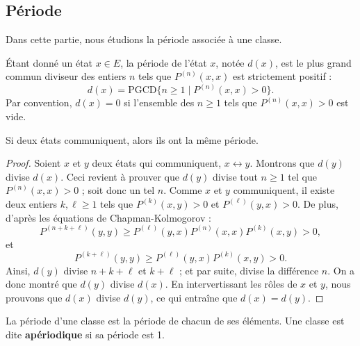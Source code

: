\subsection{Période}
Dans cette partie, nous étudions la période associée à une classe.

\begin{definition}[7.4]
Étant donné un état $x \in E$, la période de l’état $x$, notée $d(x)$, est le plus grand commun diviseur des entiers $n$ tels que $P^{(n)}(x, x)$ est strictement positif :
\[
d(x) = \mathrm{PGCD}\{n \geq 1 \mid P^{(n)}(x, x) > 0\}.
\]
Par convention, $d(x) = 0$ si l’ensemble des $n \geq 1$ tels que $P^{(n)}(x, x) > 0$ est vide.
\end{definition}

\begin{theorem}[7.5]
Si deux états communiquent, alors ils ont la même période.
\end{theorem}

\begin{proof}
Soient $x$ et $y$ deux états qui communiquent, $x \leftrightarrow y$. Montrons que $d(y)$ divise $d(x)$. Ceci revient à prouver que $d(y)$ divise tout $n \geq 1$ tel que $P^{(n)}(x, x) > 0$ ; soit donc un tel $n$. Comme $x$ et $y$ communiquent, il existe deux entiers $k, \ell \geq 1$ tels que $P^{(k)}(x, y) > 0$ et $P^{(\ell)}(y, x) > 0$. De plus, d’après les équations de Chapman-Kolmogorov :
\[
P^{(n+k+\ell)}(y, y) \geq P^{(\ell)}(y, x)P^{(n)}(x, x)P^{(k)}(x, y) > 0, 
\]
et 
\[
P^{(k+\ell)}(y, y) \geq P^{(\ell)}(y, x)P^{(k)}(x, y) > 0.
\]
Ainsi, $d(y)$ divise $n + k + \ell$ et $k + \ell$ ; et par suite, divise la différence $n$. On a donc montré que $d(y)$ divise $d(x)$. En intervertissant les rôles de $x$ et $y$, nous prouvons que $d(x)$ divise $d(y)$, ce qui entraîne que $d(x) = d(y)$.
\end{proof}

\begin{definition}[7.6]
La période d’une classe est la période de chacun de ses éléments. Une classe est dite \textbf{apériodique} si sa période est 1.
\end{definition}

